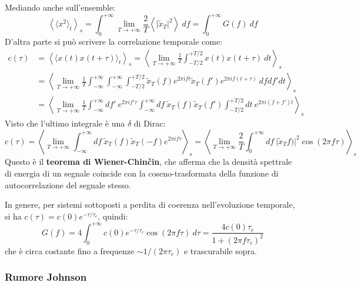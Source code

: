 \documentclass[10pt, a4paper]{scrartcl}
\numberwithin{equation}{subsection}
\theoremstyle{style1}
\theoremstyle{style2}
\begin{document}
Mediando anche sull'ensemble:
\[
\left\langle \langle x^2 \rangle_t \right\rangle_s = \int_{0} ^{+\infty} \lim_{T \to +\infty} \frac{2}{T} \left\langle \lvert \widetilde{x}_T \rvert ^2 \right\rangle \ df = \int_{0} ^{+\infty} G(f)  \ df
\] 
D'altra parte si pu\`o scrivere la correlazione temporale come:
\[
\begin{split}
	c(\tau ) &= \left\langle \langle x(t) x(t+\tau ) \rangle_t  \right\rangle_s = \left\langle \lim_{T \to +\infty} \frac{1}{T}\int_{-T / 2} ^{+ T / 2} x(t) x(t+\tau ) \ dt \right\rangle_s \\
		 &= \left\langle \lim_{T \to +\infty} \frac{1}{T}\int_{-\infty} ^{+\infty} \int_{-\infty} ^{+\infty} \int_{-T / 2} ^{+T / 2} \widetilde{x}_T (f) e ^{2\pi i ft} \widetilde{x}_T (f') e ^{2\pi i f (t+\tau )}  \ dfdf'dt \right\rangle_s\\
		 &= \left\langle \lim_{T \to +\infty} \frac{1}{T}\int_{-\infty} ^{+\infty} df ' \ e^{2 \pi i f' \tau } \int_{-\infty } ^{+\infty}df\ \widetilde{x}_T (f) \widetilde{x}_T (f') \int_{-T / 2} ^{+ T/2}  dt\ e^{2\pi i (f+f') t} \right\rangle_s
\end{split}
\] 
Visto che l'ultimo integrale \`e una $\delta $ di Dirac:
\begin{equation}
	c(\tau ) = \left\langle \lim_{T \to +\infty} \int_{-\infty} ^{+\infty} df\ \widetilde{x}_T (f) \widetilde{x}_T (-f) e^{2\pi i f \tau }  \right\rangle _s= \left\langle \lim_{T \to +\infty} \frac{2}{T}\int_{0} ^{+\infty} df \ \lvert \widetilde{x}_T f) \rvert ^2 \cos(2\pi f \tau ) \right\rangle_s
\end{equation}
Questo \`e il \textbf{teorema di Wiener-Chin\v cin}, che afferma che la densit\`a spettrale di energia di un segnale coincide con la coseno-trasformata della funzione di autocorrelazione del segnale stesso.

In genere, per sistemi sottoposti a perdita di coerenza nell'evoluzione temporale, si ha $c(\tau ) = c(0) e^{ - \tau  / \tau _c} $, quindi:
\begin{equation}
	G(f) = 4 \int_{0} ^{+\infty} c(0) e ^{- \tau  / \tau _c} \cos (2\pi f \tau ) \ d\tau = \frac{4 c(0) \tau _c}{1+ (2\pi f\tau _c)^2}
\end{equation}
che \`e circa costante fino a frequenze $\sim 1 / (2 \pi \tau _c)$ e trascurabile sopra.


\subsubsection{Rumore Johnson}
\end{document}
